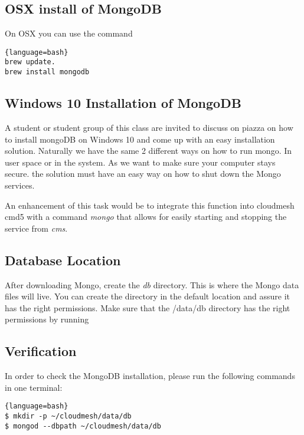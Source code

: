 \subsection{OSX install of MongoDB}

On OSX you can use the command

\begin{lstlisting}{language=bash}
brew update.
brew install mongodb
\end{lstlisting}

\subsection{Windows 10 Installation of MongoDB}

\begin{exercise}

A student or student group of this class are invited to discuss on
piazza on how to install mongoDB on Windows 10 and come up with an
easy installation solution. Naturally we have the same 2 different ways
on how to run mongo. In user space or in the system. As we want to
make sure your computer stays secure. the solution must have an easy
way on how to shut down the Mongo services.

An enhancement of this task would be to integrate this function into
cloudmesh cmd5 with a command \textit{mongo} that allows for easily
starting and stopping the service from \textit{cms}.
\end{exercise}


\subsection{Database Location}
After downloading Mongo, create the \textit{db} directory. This is where
the Mongo data files will live. You can create the directory in the
default location and assure it has the right permissions. Make sure
that the /data/db directory has the right permissions by running

\subsection{Verification}

In order to check the MongoDB installation, please run the following
commands in one terminal:

\begin{lstlisting}{language=bash}
$ mkdir -p ~/cloudmesh/data/db
$ mongod --dbpath ~/cloudmesh/data/db
\end{lstlisting}


